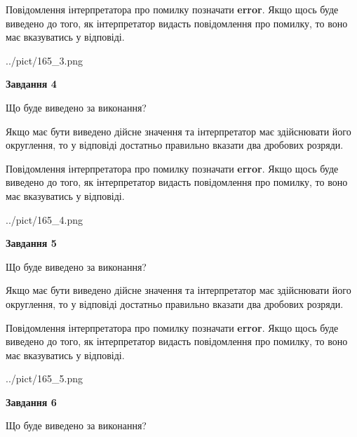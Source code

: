 \documentclass[12pt, ukrainian]{article}
\begin{document}
{\begin {Large}
Повідомлення інтерпретатора про помилку позначати \textbf{error}.
Якщо щось буде виведено до того, як інтерпретатор видасть повідомлення про помилку, 
то воно має вказуватись у відповіді. \par

\begin{center}
	{../pict/165_3.png}
\end{center}
\newpage

{\begin {center}\textbf{Завдання 4}\end {center}}\par
Що буде виведено за виконання? \par

Якщо має бути виведено дійсне значення та інтерпретатор має здійснювати його округлення, 
то у відповіді достатньо правильно вказати два дробових розряди.

Повідомлення інтерпретатора про помилку позначати \textbf{error}.
Якщо щось буде виведено до того, як інтерпретатор видасть повідомлення про помилку, 
то воно має вказуватись у відповіді. \par

\begin{center}
	{../pict/165_4.png}
\end{center}
\newpage

{\begin {center}\textbf{Завдання 5}\end {center}}\par
Що буде виведено за виконання? \par

Якщо має бути виведено дійсне значення та інтерпретатор має здійснювати його округлення, 
то у відповіді достатньо правильно вказати два дробових розряди.

Повідомлення інтерпретатора про помилку позначати \textbf{error}.
Якщо щось буде виведено до того, як інтерпретатор видасть повідомлення про помилку, 
то воно має вказуватись у відповіді. \par

\begin{center}
	{../pict/165_5.png}
\end{center}
\newpage

{\begin {center}\textbf{Завдання 6}\end {center}}\par
Що буде виведено за виконання? \par


\end{Large}}
\end{document}
